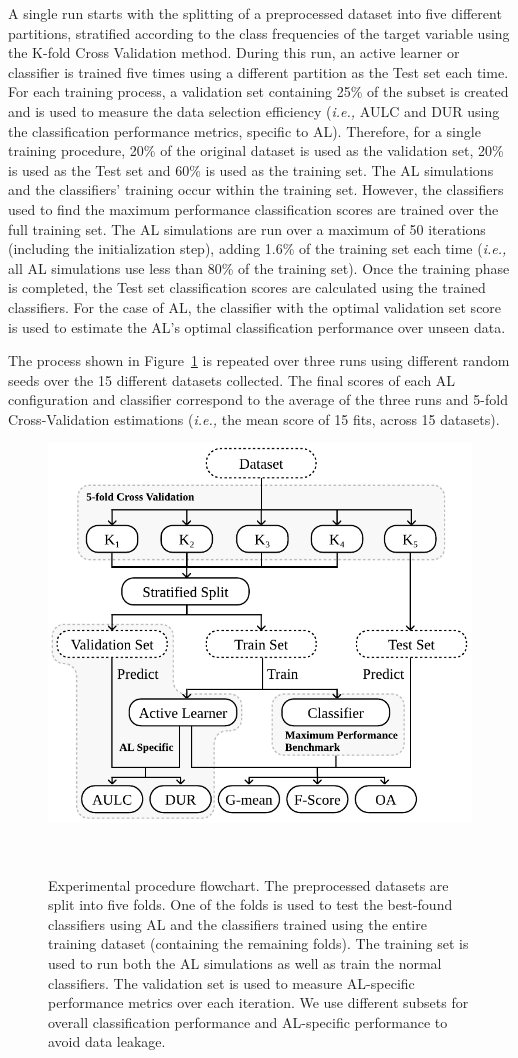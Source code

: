 \documentclass[parskip=full]{scrartcl}
\begin{document}
A single run starts with the splitting of a preprocessed dataset into five
different partitions, stratified according to the class frequencies of the
target variable using the K-fold Cross Validation method. During this run, an
active learner or classifier is trained five times using a different partition
as the Test set each time. For each training process, a validation set
containing 25\% of the subset is created and is used to measure the data
selection efficiency (\textit{i.e.,} AULC and DUR using the classification
performance metrics, specific to AL). Therefore, for a single training
procedure, 20\% of the original dataset is used as the validation set, 20\% is
used as the Test set and 60\% is used as the training set. The AL simulations
and the classifiers' training occur within the training set. However, the
classifiers used to find the maximum performance classification scores are
trained over the full training set. The AL simulations are run over a maximum
of 50 iterations (including the initialization step), adding 1.6\% of the
training set each time (\textit{i.e.,} all AL simulations use less than 80\%
of the training set). Once the training phase is completed, the Test set
classification scores are calculated using the trained classifiers. For the
case of AL, the classifier with the optimal validation set score is used to
estimate the AL's optimal classification performance over unseen data.

The process shown in Figure~\ref{fig:experimental_procedure} is repeated over
three runs using different random seeds over the 15 different datasets
collected. The final scores of each AL configuration and classifier correspond
to the average of the three runs and 5-fold Cross-Validation estimations
(\textit{i.e.,} the mean score of 15 fits, across 15 datasets).

\begin{figure}
	\centering
	\includegraphics[width=.5\linewidth]{../analysis/experimental_procedure}
    \caption{%
        Experimental procedure flowchart. The preprocessed datasets are split
        into five folds. One of the folds is used to test the best-found
        classifiers using AL and the classifiers trained using the entire
        training dataset (containing the remaining folds). The training set is
        used to run both the AL simulations as well as train the normal
        classifiers. The validation set is used to measure AL-specific
        performance metrics over each iteration. We use different subsets for
        overall classification performance and AL-specific performance to
        avoid data leakage.
    }~\label{fig:experimental_procedure}
\end{figure}
\end{document}
